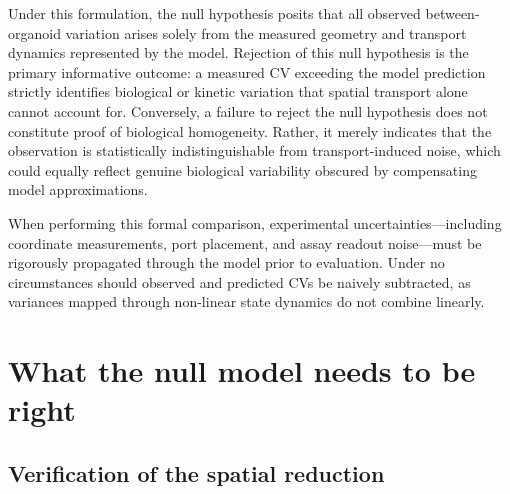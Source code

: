 \documentclass[pdflatex,sn-mathphys-num]{sn-jnl}
\numberwithin{equation}{section}
\theoremstyle{thmstyleone}%
\theoremstyle{definition}
\theoremstyle{remark}
\begin{document}
Under this formulation, the null hypothesis posits that all observed between-organoid variation arises solely from the measured geometry and transport dynamics represented by the model. Rejection of this null hypothesis is the primary informative outcome: a measured CV exceeding the model prediction strictly identifies biological or kinetic variation that spatial transport alone cannot account for. Conversely, a failure to reject the null hypothesis does not constitute proof of biological homogeneity. Rather, it merely indicates that the observation is statistically indistinguishable from transport-induced noise, which could equally reflect genuine biological variability obscured by compensating model approximations.

When performing this formal comparison, experimental uncertainties—including coordinate measurements, port placement, and assay readout noise—must be rigorously propagated through the model prior to evaluation. Under no circumstances should observed and predicted CVs be naively subtracted, as variances mapped through non-linear state dynamics do not combine linearly.

\section{What the null model needs to be right}
\label{sec:support}
\subsection{Verification of the spatial reduction}
\label{subsec:verify}
\end{document}
